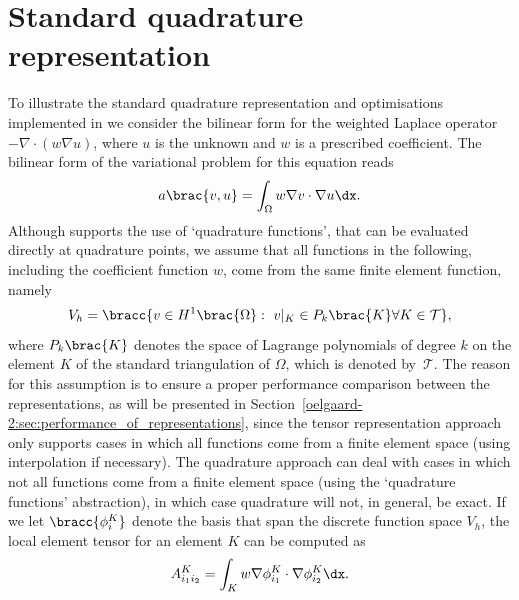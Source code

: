 \section{Standard quadrature representation}
\label{oelgaard-2:sec:standard_quadrature_representation}
%
To illustrate the standard quadrature representation and optimisations
implemented in \ffc{} we consider the bilinear form for the weighted Laplace
operator $-\nabla \cdot (w \nabla u)$, where $u$ is the unknown and $w$ is
a prescribed coefficient.
The bilinear form of the variational problem for this equation reads
%
\begin{equation}
  a\brac{v, u} = \int_{\Omega} w \nabla v \cdot \nabla u \dx.
\label{oelgaard-2:eq:weightedlaplacian}
\end{equation}
%
Although \ffc{} supports the use of `quadrature functions', that can be
evaluated directly at quadrature points, we assume that all functions in the
following, including the coefficient function $w$, come from the same finite
element function, namely
%
\begin{equation}
  V_{h} = \bracc{v \in H^{1}\brac{\Omega}: \ v\vert_K \in P_{k}\brac{K}
   \forall K \in \mathcal{T}},
\label{oelgaard-2:eq:space_H1}
\end{equation}
%
where $P_{k}\brac{K}$ denotes the space of Lagrange polynomials of degree $k$
on the element $K$ of the standard triangulation of $\Omega$, which is denoted
by~$\mathcal{T}$.
The reason for this assumption is to ensure a proper performance
comparison between the
representations, as will be presented in Section~\ref{oelgaard-2:sec:performance_of_representations},
since the tensor representation approach only supports cases in which all
functions come from a finite element space (using interpolation if necessary).
The quadrature approach can deal with cases in which not all functions come from
a finite element space (using the `quadrature functions' abstraction), in
which case quadrature will not, in general, be exact.
If we let $\bracc{\phi^{K}_{i}}$ denote the basis that span the discrete
function space $V_{h}$, the local element tensor for an element $K$ can be
computed as
%
\begin{equation}
  A^{K}_{i_{1} i_{2}} = \int_{K} w \nabla \phi^{K}_{i_1} \cdot \nabla
  \phi^{K}_{i_2} \dx.
\label{oelgaard-2:eq:localtensor}
\end{equation}

